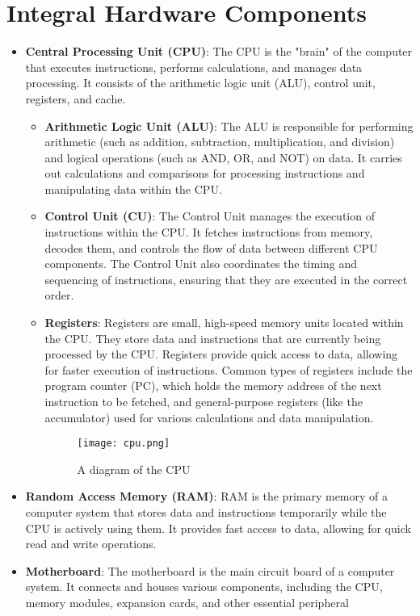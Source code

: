 \documentclass[12pt, letterpaper]{article}
\begin{document}
\newpage

\section{Integral Hardware Components}
\begin{itemize}
      \item \textbf{Central Processing Unit (CPU)}: The CPU is the "brain" of the computer that executes instructions, performs calculations, and manages data processing. It consists of the arithmetic logic unit (ALU), control unit, registers, and cache.

      \begin{itemize}
	      \item \textbf{Arithmetic Logic Unit (ALU)}: The ALU is responsible for performing arithmetic (such as addition, subtraction, multiplication, and division) and logical operations (such as AND, OR, and NOT) on data. It carries out calculations and comparisons for processing instructions and manipulating data within the CPU.
	
	      \item \textbf{Control Unit (CU)}: The Control Unit manages the execution of instructions within the CPU. It fetches instructions from memory, decodes them, and controls the flow of data between different CPU components. The Control Unit also coordinates the timing and sequencing of instructions, ensuring that they are executed in the correct order.
	
	      \item \textbf{Registers}: Registers are small, high-speed memory units located within the CPU. They store data and instructions that are currently being processed by the CPU. Registers provide quick access to data, allowing for faster execution of instructions. Common types of registers include the program counter (PC), which holds the memory address of the next instruction to be fetched, and general-purpose registers (like the accumulator) used for various calculations and data manipulation.
      
            \begin{figure}[H]
                  \centering
                  \texttt{[image: cpu.png]}
                  \caption{A diagram of the CPU}
                  \label{fig:cpu}
            \end{figure}
            \cite{image1}

      \end{itemize}

      \item \textbf{Random Access Memory (RAM)}: RAM is the primary memory of a computer system that stores data and instructions temporarily while the CPU is actively using them. It provides fast access to data, allowing for quick read and write operations.

      \item \textbf{Motherboard}: The motherboard is the main circuit board of a computer system. It connects and houses various components, including the CPU, memory modules, expansion cards, and other essential peripheral
\end{itemize}
\end{document}
